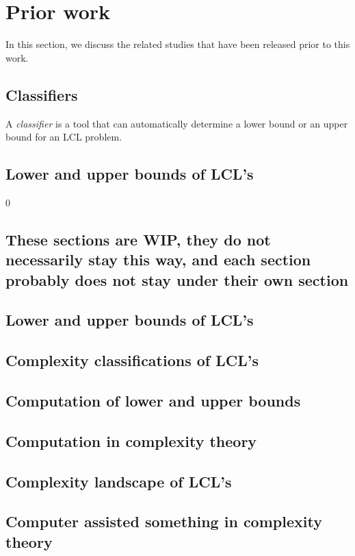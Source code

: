
\section{Prior work} \label{sec:prior_work}
In this section, we discuss the related studies that have been released prior to this work.

\subsection{Classifiers}

A \emph{classifier} is a tool that can automatically determine a lower bound or an upper bound for an LCL problem.



\subsection{Lower and upper bounds of LCL's}


0

\subsection{\color{red}These sections are WIP, they do not necessarily stay this way, and each section probably does not stay under their own section}
\subsection{Lower and upper bounds of LCL's}
\subsection{Complexity classifications of LCL's}
\subsection{Computation of lower and upper bounds}
\subsection{Computation in complexity theory}
\subsection{Complexity landscape of LCL's}
\subsection{Computer assisted something in complexity theory}
